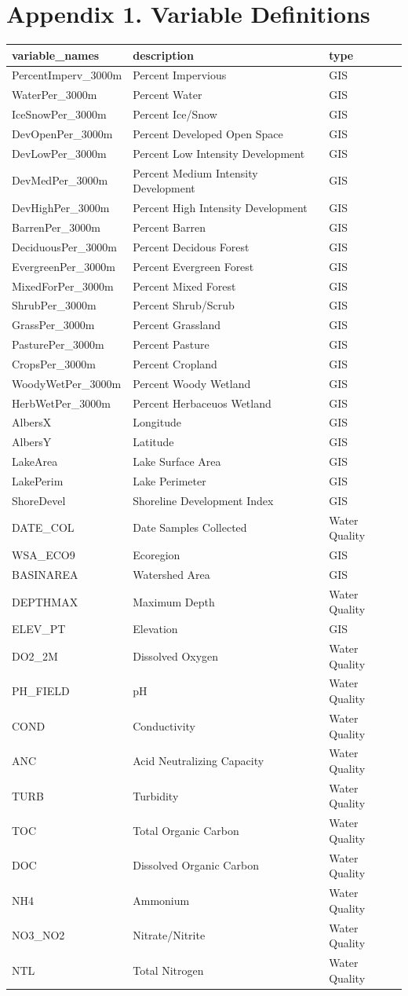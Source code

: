 \documentclass[11pt,]{article}
\begin{document}
\newpage

\section{Appendix 1. Variable
Definitions}\label{appendix-1.-variable-definitions}

\begin{longtable}[c]{@{}lll@{}}
\toprule
variable\_names & description & type\tabularnewline
\midrule
\endhead
PercentImperv\_3000m & Percent Impervious & GIS\tabularnewline
WaterPer\_3000m & Percent Water & GIS\tabularnewline
IceSnowPer\_3000m & Percent Ice/Snow & GIS\tabularnewline
DevOpenPer\_3000m & Percent Developed Open Space & GIS\tabularnewline
DevLowPer\_3000m & Percent Low Intensity Development &
GIS\tabularnewline
DevMedPer\_3000m & Percent Medium Intensity Development &
GIS\tabularnewline
DevHighPer\_3000m & Percent High Intensity Development &
GIS\tabularnewline
BarrenPer\_3000m & Percent Barren & GIS\tabularnewline
DeciduousPer\_3000m & Percent Decidous Forest & GIS\tabularnewline
EvergreenPer\_3000m & Percent Evergreen Forest & GIS\tabularnewline
MixedForPer\_3000m & Percent Mixed Forest & GIS\tabularnewline
ShrubPer\_3000m & Percent Shrub/Scrub & GIS\tabularnewline
GrassPer\_3000m & Percent Grassland & GIS\tabularnewline
PasturePer\_3000m & Percent Pasture & GIS\tabularnewline
CropsPer\_3000m & Percent Cropland & GIS\tabularnewline
WoodyWetPer\_3000m & Percent Woody Wetland & GIS\tabularnewline
HerbWetPer\_3000m & Percent Herbaceuos Wetland & GIS\tabularnewline
AlbersX & Longitude & GIS\tabularnewline
AlbersY & Latitude & GIS\tabularnewline
LakeArea & Lake Surface Area & GIS\tabularnewline
LakePerim & Lake Perimeter & GIS\tabularnewline
ShoreDevel & Shoreline Development Index & GIS\tabularnewline
DATE\_COL & Date Samples Collected & Water Quality\tabularnewline
WSA\_ECO9 & Ecoregion & GIS\tabularnewline
BASINAREA & Watershed Area & GIS\tabularnewline
DEPTHMAX & Maximum Depth & Water Quality\tabularnewline
ELEV\_PT & Elevation & GIS\tabularnewline
DO2\_2M & Dissolved Oxygen & Water Quality\tabularnewline
PH\_FIELD & pH & Water Quality\tabularnewline
COND & Conductivity & Water Quality\tabularnewline
ANC & Acid Neutralizing Capacity & Water Quality\tabularnewline
TURB & Turbidity & Water Quality\tabularnewline
TOC & Total Organic Carbon & Water Quality\tabularnewline
DOC & Dissolved Organic Carbon & Water Quality\tabularnewline
NH4 & Ammonium & Water Quality\tabularnewline
NO3\_NO2 & Nitrate/Nitrite & Water Quality\tabularnewline
NTL & Total Nitrogen & Water Quality\tabularnewline

\end{longtable}
\end{document}
